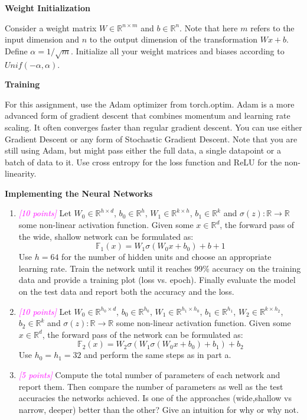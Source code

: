 \documentclass{article}
\newcommand{\field}[1]{\mathbb{#1}}
\newcommand{\1}{\mathbf{1}}
\newcommand{\R}{\field{R}} %
\newcommand{\F}{\field{F}} %
\newcommand{\points}[1]{\small\textcolor{magenta}{\emph{[#1 points]}} \normalsize}
\begin{document}
\textbf{Weight Initialization}

Consider a weight matrix $W\in\R^{n\times m}$ and $b\in\R^n$. Note that here $m$ refers to the input dimension and $n$ to the output dimension of the transformation $Wx+b$. Define $\alpha = 1/\sqrt m$. Initialize all your weight matrices and biases according to $Unif(-\alpha,\alpha)$.

\textbf{Training} 

For this assignment, use the Adam optimizer from torch.optim. Adam is a more advanced form of gradient descent that combines momentum and learning rate scaling. It often  converges faster than regular gradient descent. You can use either Gradient Descent or any form of Stochastic Gradient Descent. Note that you are still using Adam,  but might pass either the full data, a single datapoint or a batch of data to it. Use cross entropy for the loss function and ReLU for the non-linearity.


\textbf{Implementing the Neural Networks}
\begin{enumerate}
    \item \points{10} Let $W_0\in\R^{h\times d}$, $b_0\in\R^h$, $W_1\in\R^{k\times h}$, $b_1\in\R^k$ and $\sigma (z): \R \rightarrow \R$ some non-linear activation function. Given some $x\in\R^d$, the forward pass of the wide, shallow network can be formulated as:
    $$\F_1(x) = W_1\sigma (W_0x+b_0) + b+1$$
    Use $h=64$ for the number of hidden units and choose an appropriate learning rate. Train the network until it reaches 99\% accuracy on the training data and provide a training plot (loss vs. epoch). Finally evaluate the model on the test data and report both the accuracy and the loss.
    
    \item \points{10} Let $W_0\in\R^{h_0\times d}$, $b_0\in\R^{h_0}$, $W_1\in\R^{h_1\times h_0}$, $b_1 \in \R^{h_1}$, $W_2\in \R^{k\times h_2}$, $b_2 \in \R^k$ and $\sigma (z): \R \rightarrow \R$ some non-linear activation function. Given some $x\in\R^d$, the forward pass of the network can be formulated as:
    $$\F_2(x) = W_2\sigma(W_1\sigma (W_0x + b_0) +b_1) + b_2$$
    Use $h_0 = h_1= 32$ and perform the same steps as in part a.
    
     \item \points{5} Compute the total number of parameters of each network and report them. Then compare the number of parameters as well as the test accuracies the networks achieved. Is one of the approaches (wide,shallow vs narrow, deeper) better than the other? Give an intuition for why or why not.
\end{enumerate}
\end{document}
